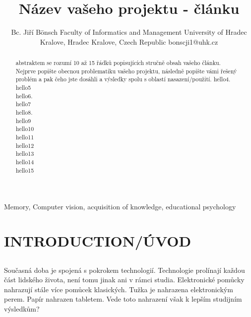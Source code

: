 \documentclass[journal]{IEEEtran}
\title{Název vašeho projektu - článku}
\author{Bc. Jiří Bönsch
        \linebreak
        Faculty of Informatics and Management
        \linebreak
        University of Hradec Kralove,
        \linebreak
        Hradec Kralove, Czech Republic
        \linebreak
        bonscji1@uhk.cz

}
\begin{document}
\maketitle

\begin{abstract} %
        abstraktem se rozumí 10 až 15 řádků popisujících stručně obsah vašeho článku. Nejprve popište obecnou problematiku vašeho projektu, následně popište vámi řešený problém a pak čeho jste dosáhli a výsledky spolu s oblastí nasazení/použití.
        hello4.\\
        hello5\\
        hello6.\\
        hello7\\
        hello8.\\
        hello9\\
        hello10\\
        hello11\\
        hello12\\
        hello13\\
        hello14\\
        hello15\\

\end{abstract}

\begin{IEEEkeywords} %
Memory, Computer vision, acquisition of knowledge, educational psychology
\end{IEEEkeywords}


\IEEEpeerreviewmaketitle



\section{INTRODUCTION/ÚVOD}

\subsection{}
Současná doba je spojená s pokrokem technologií.
Technologie prolínají každou část lidského života, není tomu jinak ani v rámci studia.
Elektronické pomůcky nahrazují stále více pomůcek klasických.
Tužka je nahrazena elektronickým perem. Papír nahrazen tabletem.
Vede toto nahrazení však k lepším studijním výsledkům?
\end{document}
